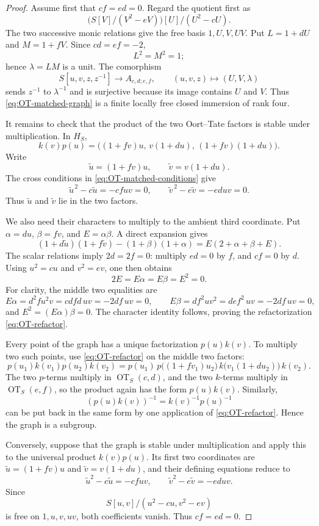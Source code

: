 \documentclass[11pt]{amsart}
\theoremstyle{remark}
\begin{document}
\begin{proof}
Assume first that \(cf=ed=0\).
Regard the quotient first as
\[
 \bigl(S[V]/(V^2-eV)\bigr)[U]/(U^2-cU).
\]
The two successive monic relations give the free basis \(1,U,V,UV\).
Put
\(L=1+dU\) and \(M=1+fV\).  Since \(cd=ef=-2\),
\[
 L^2=M^2=1;
\]
hence \(\lambda=LM\) is a unit.  The comorphism
\[
 S[u,v,z,z^{-1}]\longrightarrow A_{c,d;e,f},
 \qquad
 (u,v,z)\longmapsto(U,V,\lambda)
\]
sends \(z^{-1}\) to \(\lambda^{-1}\) and is surjective because its
image contains \(U\) and \(V\).  Thus \eqref{eq:OT-matched-graph} is a
finite locally free closed immersion of rank four.

It remains to check that the product of the two Oort--Tate factors is
stable under multiplication.  In \(H_S\),
\[
 k(v)p(u)
 =
 \bigl((1+fv)u,\,v(1+du),\,(1+fv)(1+du)\bigr).
\]
Write
\[
 \widetilde u=(1+fv)u,
 \qquad
 \widetilde v=v(1+du).
\]
The cross conditions in \eqref{eq:OT-matched-conditions} give
\[
 \widetilde u^{\,2}-c\widetilde u=-cfuv=0,
 \qquad
 \widetilde v^{\,2}-e\widetilde v=-eduv=0.
\]
Thus \(\widetilde u\) and \(\widetilde v\) lie in the two factors.

We also need their characters to multiply to the ambient third
coordinate.  Put \(\alpha=du\), \(\beta=fv\), and
\(E=\alpha\beta\).  A direct expansion gives
\[
 (1+d\widetilde u)(1+f\widetilde v)
 -(1+\beta)(1+\alpha)
 =
 E(2+\alpha+\beta+E).
\]
The scalar relations imply \(2d=2f=0\): multiply \(ed=0\) by \(f\),
and \(cf=0\) by \(d\).  Using \(u^2=cu\) and
\(v^2=ev\), one then obtains
\[
 2E=E\alpha=E\beta=E^2=0.
\]
For clarity, the middle two equalities are
\[
 E\alpha=d^2f u^2v
          =cdfd\,uv=-2df\,uv=0,
 \qquad
 E\beta=df^2uv^2
          =def^2\,uv=-2df\,uv=0,
\]
and \(E^2=(E\alpha)\beta=0\).
The character identity follows, proving the refactorization
\eqref{eq:OT-refactor}.

Every point of the graph has a unique factorization \(p(u)k(v)\).
To multiply two such points, use \eqref{eq:OT-refactor} on the middle
two factors:
\[
 p(u_1)k(v_1)p(u_2)k(v_2)
 =
 p(u_1)\,
 p\bigl((1+fv_1)u_2\bigr)\,
 k\bigl(v_1(1+du_2)\bigr)\,
 k(v_2).
\]
The two \(p\)-terms multiply in \(\operatorname{OT}_S(c,d)\), and the
two \(k\)-terms multiply in \(\operatorname{OT}_S(e,f)\), so the product
again has the form \(p(u)k(v)\).  Similarly,
\[
 (p(u)k(v))^{-1}=k(v)^{-1}p(u)^{-1}
\]
can be put back in the same form by one application of
\eqref{eq:OT-refactor}.  Hence the graph is a subgroup.

Conversely, suppose that the graph is stable under multiplication and
apply this to the universal product \(k(v)p(u)\).  Its first two
coordinates are \(\widetilde u=(1+fv)u\) and
\(\widetilde v=v(1+du)\), and their defining equations reduce to
\[
 \widetilde u^2-c\widetilde u=-cfuv,\qquad
 \widetilde v^2-e\widetilde v=-eduv.
\]
Since
\[
 S[u,v]/(u^2-cu,v^2-ev)
\]
is free on \(1,u,v,uv\), both coefficients vanish.  Thus \(cf=ed=0\).
\end{proof}
\end{document}
